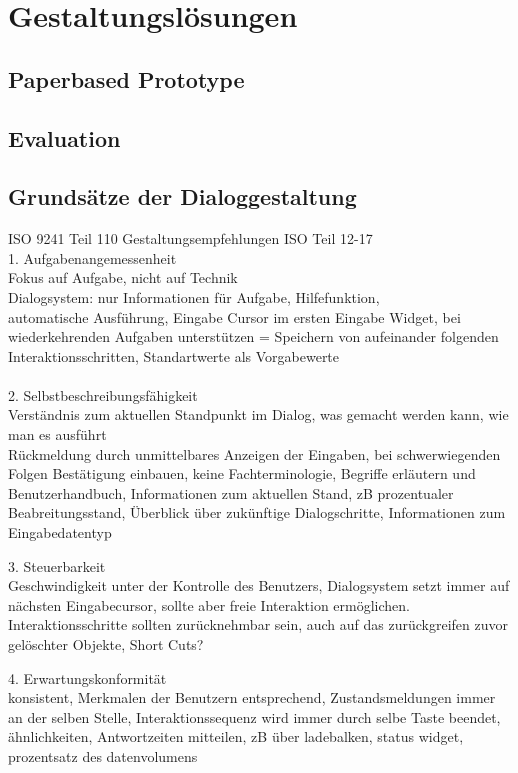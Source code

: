 
\section{Gestaltungslösungen}
\subsection{Paperbased Prototype}

 \subsection{Evaluation}

\subsection{Grundsätze der Dialoggestaltung}
 ISO 9241 Teil 110
 Gestaltungsempfehlungen ISO Teil 12-17
\\
 1. Aufgabenangemessenheit\\
 	Fokus auf Aufgabe, nicht auf Technik\\
 	Dialogsystem: nur Informationen für Aufgabe, Hilfefunktion, \\automatische Ausführung, Eingabe Cursor im ersten Eingabe Widget, bei wiederkehrenden Aufgaben unterstützen = Speichern von aufeinander folgenden Interaktionsschritten, Standartwerte als Vorgabewerte\\
\\
 2. Selbstbeschreibungsfähigkeit\\
    Verständnis zum aktuellen Standpunkt im Dialog, was gemacht werden kann, wie man es ausführt\\
    Rückmeldung durch unmittelbares Anzeigen der Eingaben, bei schwerwiegenden Folgen Bestätigung einbauen, keine Fachterminologie, Begriffe erläutern und Benutzerhandbuch, Informationen zum aktuellen Stand, zB prozentualer Beabreitungsstand, Überblick über zukünftige Dialogschritte, Informationen zum Eingabedatentyp

 3. Steuerbarkeit\\
 	Geschwindigkeit unter der Kontrolle des Benutzers, Dialogsystem setzt immer auf nächsten Eingabecursor, sollte aber freie Interaktion ermöglichen. Interaktionsschritte sollten zurücknehmbar sein, auch auf das zurückgreifen zuvor gelöschter Objekte, Short Cuts?

 4. Erwartungskonformität\\
 	konsistent, Merkmalen der Benutzern entsprechend, Zustandsmeldungen immer an der selben Stelle, Interaktionssequenz wird immer durch selbe Taste beendet, ähnlichkeiten, Antwortzeiten mitteilen, zB über ladebalken, status widget, prozentsatz des datenvolumens

